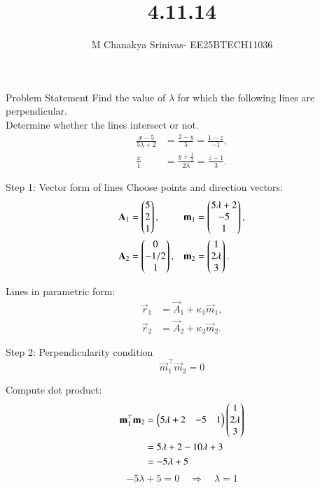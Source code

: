 \documentclass{beamer}
\title %
{4.11.14}
\date{}
\author %
{M Chanakya Srinivas- EE25BTECH11036}
\begin{document}
\frame{\titlepage}


\begin{frame}{Problem Statement}
Find the value of \(\lambda\) for which the following lines are perpendicular.\\
Determine whether the lines intersect or not.
\begin{align}
\frac{x-5}{5\lambda+2} &= \frac{2-y}{5} = \frac{1-z}{-1}, \\
\frac{x}{1} &= \frac{y+\tfrac{1}{2}}{2\lambda} = \frac{z-1}{3}.
\end{align}
\end{frame}

\begin{frame}{Step 1: Vector form of lines}
Choose points and direction vectors:
\begin{align}
\mathbf A_1 &= \begin{pmatrix}5\\2\\1\end{pmatrix}, & \mathbf m_1 &= \begin{pmatrix}5\lambda+2\\-5\\1\end{pmatrix},\\
\mathbf A_2 &= \begin{pmatrix}0\\-1/2\\1\end{pmatrix}, & \mathbf m_2 &= \begin{pmatrix}1\\2\lambda\\3\end{pmatrix}.
\end{align}

Lines in parametric form:
\begin{align}
\vec r_1 &= \vec A_1 + \kappa_1 \vec m_1, \\
\vec r_2 &= \vec A_2 + \kappa_2 \vec m_2.
\end{align}
\end{frame}

\begin{frame}{Step 2: Perpendicularity condition}
\[
\vec m_1^{\top} \vec m_2 = 0
\]

Compute dot product:
\begin{align}
\mathbf m_1^{\top} \mathbf m_2
&= \begin{pmatrix}5\lambda+2 & -5 & 1\end{pmatrix} \begin{pmatrix}1\\2\lambda\\3\end{pmatrix} \\
&= 5\lambda+2 - 10\lambda +3 \\
&= -5\lambda +5
\end{align}
\[
-5\lambda+5=0 \quad \Rightarrow \quad \boxed{\lambda=1}
\]
\end{frame}
\end{document}
